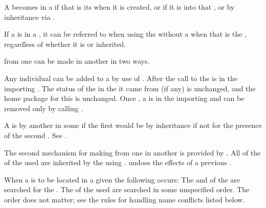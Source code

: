 A  becomes  in a  
    if that is its  when it is created,
 or if it is  into that ,
 or by inheritance via .

If a  is  in a ,
it can be referred to when using the 
without a  when that  is the ,
regardless of whether it is  or inherited.


 from one  can be made  
in another  in two ways.

\beginlist 
\itemitem{--}
Any individual  can be added to a  by use
of .  After the call to  the
 is  in the importing .
The status of the  in the  
it came from (if any) is unchanged, and the home package for                               
this  is unchanged.
Once , a  is  in the
importing 
and can be removed only by calling .

A  is  by another  
in some  if the first  would be 
by inheritance if not for the presence of the second .
See .

\itemitem{--}
The second mechanism for making  from one 
 in another is provided by .  
All of the  of the used  are inherited
by the using .
 undoes the effects of a previous .  
\endlist

\endsubsubsubsection%


When a  is to be located in a given  
the following occurs:
\beginlist 
\itemitem{--} The  and  of the 
 are searched for the .
\itemitem{--} The  of the used  are 
searched
in some unspecified order.  The
order does not matter; see the rules for handling name
conflicts listed below. 
\endlist

